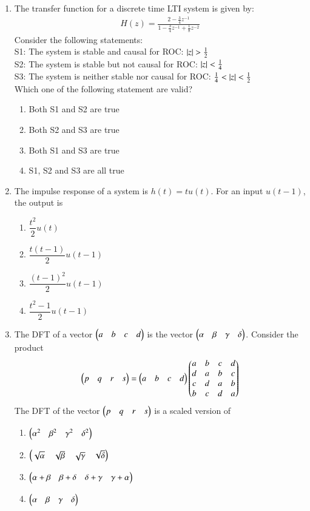 \begin{enumerate}[label=\arabic*.,ref=\theenumi]
\item The transfer function for a discrete time LTI system is given by:
\begin{align}
    H(z) = \frac{2 - \frac{3}{4}z^{-1}}{1 - \frac{3}{4}z^{-1} + \frac{1}{8}z^{-2}}
\end{align}
Consider the following statements:\\
S1: The system is stable and causal for ROC: $\left\vert z\right\vert > \frac{1}{2}$\\
S2: The system is stable but not causal for ROC:  $\left\vert z\right\vert < \frac{1}{4}$\\
S3: The system is neither stable nor causal for ROC:  $\frac{1}{4}<\left\vert z\right\vert < \frac{1}{2}$\\
Which one of the following statement are valid?
\begin{enumerate}
    \item Both S1 and S2 are true
    \item Both S2 and S3 are true
    \item Both S1 and S3 are true
    \item S1, S2 and S3 are all true
\end{enumerate}
\solution

\item The impulse response of a system is $h(t)=tu(t)$. For an input $u(t-1)$, the output is 
\begin{enumerate}
    \item $\dfrac{t^{2}}{2}u(t)$
    \item $\dfrac{t(t-1)}{2}u(t-1)$
    \item $\dfrac{(t-1)^{2}}{2}u(t-1)$
    \item $\dfrac{t^{2}-1}{2}u(t-1)$
\end{enumerate}
\solution

%
\item The DFT of a vector $\begin{pmatrix}a & b & c & d\end{pmatrix}$ is the vector $\begin{pmatrix}\alpha & \beta & \gamma & \delta\end{pmatrix}$. Consider the product 
\begin{equation}
    \begin{pmatrix}p & q & r & s\end{pmatrix} = \begin{pmatrix}a & b & c & d\end{pmatrix}\begin{pmatrix}a & b & c & d\\ d & a & b & c\\ c & d & a & b\\b & c & d &a\end{pmatrix}
\end{equation}
The DFT of the vector $\begin{pmatrix}p & q & r & s\end{pmatrix}$ is a scaled version of 
\begin{enumerate}[label = (\Alph*)]
    \item $\begin{pmatrix}\alpha^2 & \beta ^2 & \gamma^2 & \delta^2\end{pmatrix}$
    \item $\begin{pmatrix}\sqrt{\alpha} & \sqrt{\beta} & \sqrt{\gamma} & \sqrt{\delta}\end{pmatrix}$
    \item $\begin{pmatrix}\alpha+\beta & \beta+\delta & \delta+\gamma & \gamma+\alpha\end{pmatrix}$
    \item $\begin{pmatrix}\alpha & \beta & \gamma & \delta\end{pmatrix}$
\end{enumerate}
\solution



\end{enumerate}
